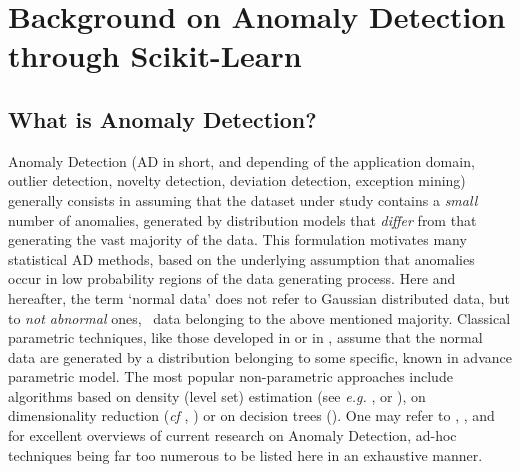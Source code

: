 \chapter{Background on Anomaly Detection through Scikit-Learn}

\section{What is Anomaly Detection?}
Anomaly Detection (AD in short, and depending of the application domain, outlier detection, novelty detection, deviation detection, exception mining) generally consists in assuming that the dataset under study contains a \textit{small} number of anomalies, generated by distribution models that  \textit{differ} from that generating the vast majority of the data.
This formulation motivates many statistical AD methods, based on the underlying assumption that anomalies occur in low probability regions of the data generating process. Here and hereafter, the term `normal data' does not refer to Gaussian distributed data, but  to  \emph{not abnormal} ones, \ie~data belonging to the above mentioned majority. 
Classical parametric techniques, like those developed in \cite{Barnett94} or in \cite{Eskin2000}, assume that the normal data are generated by a distribution belonging to some  specific, known in advance parametric model.  
The most popular non-parametric approaches include algorithms based on density (level set) estimation (see \textit{e.g.} \cite{Scholkopf2001},  \cite{Scott2006} or \cite{Breunig2000LOF}), on dimensionality reduction (\textit{cf} \cite{Shyu2003}, \cite{Aggarwal2001}) or on decision trees (\cite{Liu2008}).
One may refer to \cite{Hodge2004survey}, \cite{Chandola2009survey}, \cite{Patcha2007survey} and \cite{Markou2003survey} for excellent overviews of current research on Anomaly Detection, ad-hoc techniques being far too numerous to be listed here in an exhaustive manner.


